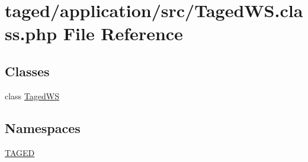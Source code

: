 \hypertarget{_taged_w_s_8class_8php}{}\section{taged/application/src/\+Taged\+WS.class.\+php File Reference}
\label{_taged_w_s_8class_8php}
\subsection*{Classes}
\begin{DoxyCompactItemize}
\item 
class \hyperlink{class_taged_w_s}{Taged\+WS}
\end{DoxyCompactItemize}
\subsection*{Namespaces}
\begin{DoxyCompactItemize}
\item 
 \hyperlink{namespace_t_a_g_e_d}{T\+A\+G\+ED}
\end{DoxyCompactItemize}
